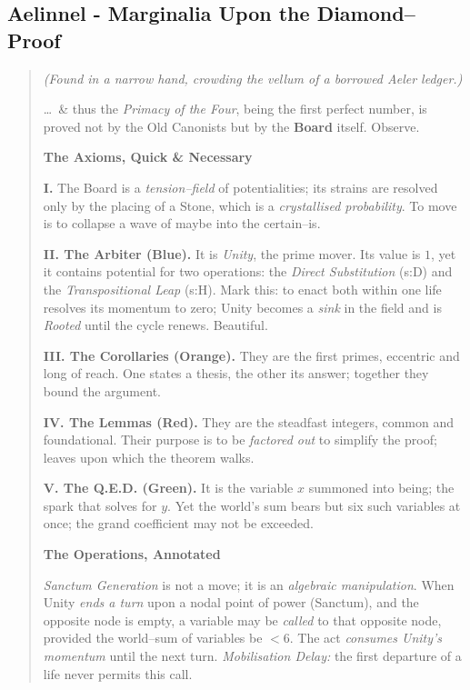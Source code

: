 \documentclass[11pt]{article}
\begin{document}
\subsection{Aelinnel -  Marginalia Upon the Diamond--Proof}
\begin{quote}\small\itshape
\textit{(Found in a narrow hand, crowding the vellum of a borrowed Aeler ledger.)}

\medskip
\ldots\ \& thus the \emph{Primacy of the Four}, being the first perfect number, is proved not by the Old Canonists but by the \textbf{Board} itself. Observe.

\medskip
\textbf{The Axioms, Quick \& Necessary}

\textbf{I.} The Board is a \emph{tension--field} of potentialities; its strains are resolved only by the placing of a Stone, which is a \emph{crystallised probability}. To move is to collapse a wave of maybe into the certain--is.

\textbf{II. The Arbiter (Blue).} It is \emph{Unity}, the prime mover. Its value is $1$, yet it contains potential for two operations: the \emph{Direct Substitution} (s:D) and the \emph{Transpositional Leap} (s:H). Mark this: to enact both within one life resolves its momentum to zero; Unity becomes a \emph{sink} in the field and is \emph{Rooted} until the cycle renews. Beautiful.

\textbf{III. The Corollaries (Orange).} They are the first primes, eccentric and long of reach. One states a thesis, the other its answer; together they bound the argument.

\textbf{IV. The Lemmas (Red).} They are the steadfast integers, common and foundational. Their purpose is to be \emph{factored out} to simplify the proof; leaves upon which the theorem walks.

\textbf{V. The Q.E.D. (Green).} It is the variable $x$ summoned into being; the spark that solves for $y$. Yet the world's sum bears but six such variables at once; the grand coefficient may not be exceeded.

\medskip
\textbf{The Operations, Annotated}

\emph{Sanctum Generation} is not a move; it is an \emph{algebraic manipulation}. When Unity \emph{ends a turn} upon a nodal point of power (Sanctum), and the opposite node is empty, a variable may be \emph{called} to that opposite node, provided the world--sum of variables be $<6$. The act \emph{consumes Unity's momentum} until the next turn. \emph{Mobilisation Delay:} the first departure of a life never permits this call.


\end{quote}
\end{document}
